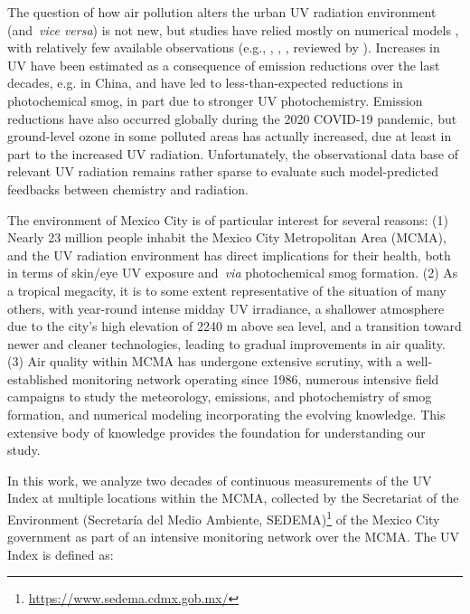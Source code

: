 \documentclass[journal=jacsat,manuscript=article]{achemso}
\begin{document}
The question of how air pollution alters the urban UV radiation environment
(and~\emph{vice versa}) is not new, but studies have relied mostly on
numerical models \cite{Liu_1991,Sabziparvar_1998,Madronich_2011},
with relatively few available observations (e.g.,
\citet{McKenzie_2008}, \citet{Panicker_2009}, \citet{Palancar_2013},
reviewed by \citet{Bais_2015}). Increases in UV have been estimated as a consequence
of emission reductions over the last decades, e.g. in China,\citep{Hollaway_2019,Li_2018,Wang_2020}
and have led to less-than-expected
reductions in photochemical smog, in part due to stronger UV
photochemistry.\citep{Wang_2019,Gao_2020,Ma_2021}
Emission reductions have also occurred
globally during the 2020 COVID-19 pandemic,\citep{Bauwens_2020,Venter_2020}
but ground-level ozone in some polluted areas has actually
increased,\citep{Shi_2020,Le_2020} due at least in part to the increased UV
radiation. Unfortunately, the observational data base of relevant UV
radiation remains rather sparse to evaluate such model-predicted feedbacks between chemistry and radiation.~~

The environment of Mexico City is of particular interest for several
reasons: (1) Nearly 23 million people inhabit the Mexico City
Metropolitan Area (MCMA), and the UV radiation environment has direct implications
for their health, both in terms of skin/eye UV exposure and~\emph{via}
photochemical smog formation. (2) As a tropical megacity, it is to some
extent representative of the situation of many others, with year-round
intense midday UV irradiance, a shallower atmosphere due to the city's
high elevation of 2240 m above sea level, and a transition toward newer
and cleaner technologies, leading to gradual improvements in air
quality. (3) Air quality within MCMA has undergone extensive scrutiny,
with a well-established monitoring network operating since
1986,\cite{RAMA}
numerous intensive field campaigns to study the
meteorology, emissions, and photochemistry of smog
formation,\citep{Doran_1998,Molina_2007,Molina_2010}
and numerical modeling incorporating the
evolving knowledge.\citep{Jazcilevich_2005,Tie_2007,Zhang_2009,Zavala_2020}
This extensive body of knowledge
provides the foundation for understanding our study.

In this work, we analyze two decades of continuous measurements of the UV Index
at multiple locations within the MCMA, collected by the Secretariat of
the Environment (Secretaría del Medio Ambiente,
SEDEMA)\footnote{\url{https://www.sedema.cdmx.gob.mx/}} of the Mexico
City government as part of an intensive monitoring network over the
MCMA. The UV Index is defined as:
\end{document}
